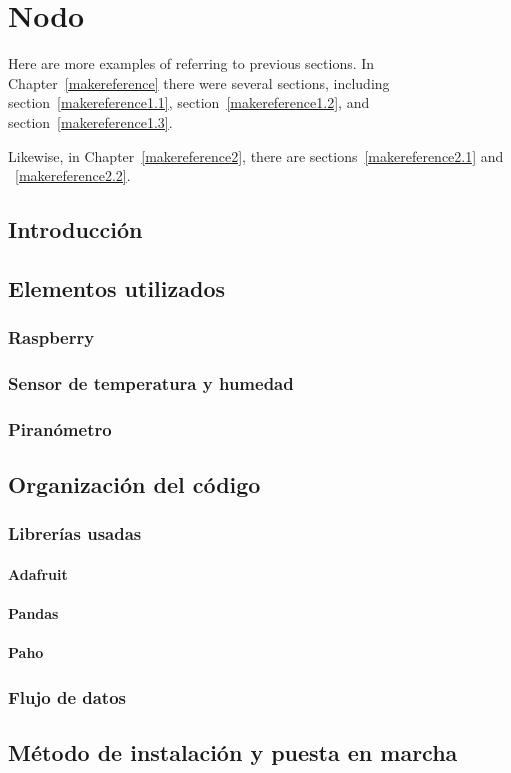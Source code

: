 \cleardoublepage

\chapter{Nodo}
\label{makereference4}

Here are more examples of referring to previous sections.  In
Chapter~\ref{makereference} there were several sections, including
section~\ref{makereference1.1}, section~\ref{makereference1.2},
and section~\ref{makereference1.3}.

Likewise, in Chapter~\ref{makereference2}, there are
sections~\ref{makereference2.1} and ~\ref{makereference2.2}.

\section{Introducción}
\label{makereference4.1}

\section{Elementos utilizados}
\label{makereference4.2}
\subsection{Raspberry}
	\subsection{Sensor de temperatura y humedad}
	\subsection{Piranómetro}

\section{Organización del código}
\label{makereference4.3} 
	\subsection{Librerías usadas}
		\subsubsection{Adafruit}
		\subsubsection{Pandas}
		\subsubsection{Paho}
	\subsection{Flujo de datos}

\section{Método de instalación y puesta en marcha}
\label{makereference4.4}